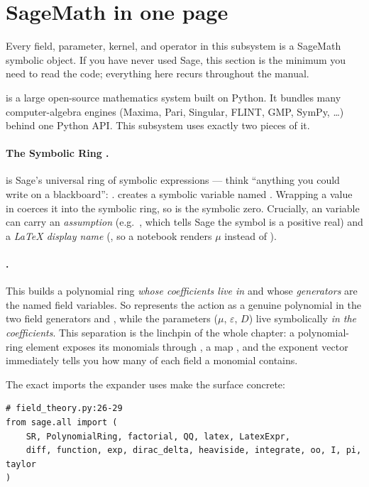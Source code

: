 \section{SageMath in one page}

Every field, parameter, kernel, and operator in this subsystem is a SageMath
symbolic object. If you have never used Sage, this section is the minimum you need
to read the code; everything here recurs throughout the manual.

 is a large open-source mathematics system built on Python. It
bundles many computer-algebra engines (Maxima, Pari, Singular, FLINT, GMP, SymPy,
\dots) behind one Python API. This subsystem uses exactly two pieces of it.

\paragraph{The Symbolic Ring .}  is Sage's universal ring of
symbolic expressions --- think ``anything you could write on a blackboard'':
.  creates a symbolic variable
named . Wrapping a value in  coerces it into the symbolic
ring, so  is the symbolic zero. Crucially, an  variable can
carry an \emph{assumption} (e.g.\ , which tells Sage the
symbol is a positive real) and a \emph{LaTeX display name} (,
so a notebook renders $\mu$ instead of ).

\paragraph{.} This builds a polynomial ring
\emph{whose coefficients live in } and whose \emph{generators} are the
named field variables. So  represents the
action as a genuine polynomial in the two field generators  and
, while the parameters ($\mu$, $\varepsilon$, $D$) live symbolically
\emph{in the coefficients}. This separation is the linchpin of the whole chapter:
a polynomial-ring element exposes its monomials through , a map
, and the exponent vector immediately tells
you how many of each field a monomial contains.

The exact imports the expander uses make the surface concrete:

\begin{lstlisting}
# field_theory.py:26-29
from sage.all import (
    SR, PolynomialRing, factorial, QQ, latex, LatexExpr,
    diff, function, exp, dirac_delta, heaviside, integrate, oo, I, pi, taylor
)
\end{lstlisting}

